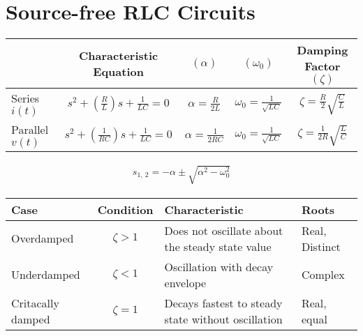 \documentclass[a4paper,11pt]{article}
\begin{document}
	\section{Source-free RLC Circuits}
	\begin{center}
	\begin{tabular}{|l|c|c|c|c|}
		\hline
		& Characteristic Equation & $(\alpha)$ & $(\omega_0)$ & Damping Factor $(\zeta)$\\ \hline
		Series $i(t)$ & $s^2 + \left(\frac{R}{L}\right)s + \frac{1}{LC} = 0$ & $\alpha = \frac{R}{2L}$ & $\omega_0 = \frac{1}{\sqrt{LC}}$ & $\zeta = \frac{R}{2}\sqrt{\frac{C}{L}}$ \\ \hline
		Parallel $v(t)$ & $s^2 + \left(\frac{1}{RC}\right)s + \frac{1}{LC} = 0$ & $\alpha = \frac{1}{2RC}$ & $\omega_0 = \frac{1}{\sqrt{LC}}$ & $\zeta = \frac{1}{2R}\sqrt{\frac{L}{C}}$ \\ \hline
	\end{tabular}

	\begin{align}
		s_{1,~2} = -\alpha \pm \sqrt{\alpha^2 - \omega_0^2}
	\end{align}

	\begin{tabular}{|l|c|l|l|}
		\hline
		Case & Condition & Characteristic & Roots \\ \hline
		Overdamped & $\zeta > 1$ & Does not oscillate about the steady state value & Real, Distinct \\ \hline
		Underdamped & $\zeta < 1$ & Oscillation with decay envelope & Complex \\ \hline 
		Critacally damped & $\zeta = 1$ & Decays fastest to steady state without oscillation & Real, equal \\ \hline
	\end{tabular}
	\end{center}
\end{document}
